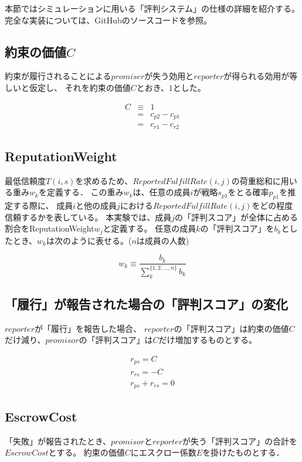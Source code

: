 本節ではシミュレーションに用いる「評判システム」の仕様の詳細を紹介する。
完全な実装については、GitHubのソースコード\cite{mitamoto2021}を参照。

\subsection{約束の価値$C$}
約束が履行されることによる$promiser$が失う効用と$reporter$が得られる効用が等しいと仮定し、
それを約束の価値$C$とおき、$1$とした。

\begin{eqnarray}
  C &\equiv& 1 \\
    &=& c_{p2} - c_{p1} \\
    &=& c_{r1} - c_{r2}
\end{eqnarray}

\subsection{ReputationWeight}
最低信頼度$T(i, s)$を求めるため、$ReportedFulfillRate(i, j)$の荷重総和に用いる重み$w_k$を定義する．
この重み$w_k$は、任意の成員$i$が戦略$s_{p1}$をとる確率$p_{p1}$を推定する際に、
成員$i$と他の成員$j$における$ReportedFulfillRate(i, j)$をどの程度信頼するかを表している。
本実験では、成員$j$の「評判スコア」が全体に占める割合をReputationWeight$w_j$と定義する。
任意の成員$k$の「評判スコア」を$b_k$としたとき、$w_k$は次のように表せる。($n$は成員の人数)

\begin{equation*}
  w_k \equiv \frac{b_k}{\sum^{\{1,2,...,n\}}_{k}b_k}
\end{equation*}

\subsection{「履行」が報告された場合の「評判スコア」の変化}
$reporter$が「履行」を報告した場合、
$reporter$の「評判スコア」は約束の価値$C$だけ減り、$promisor$の「評判スコア」は$C$だけ増加するものとする。

\begin{gather}
  r_{ps} = C \\
  r_{rs} = -C \\
  r_{ps} + r_{rs} = 0
\end{gather}


\subsection{EscrowCost}
「失敗」が報告されたとき、$promisor$と$reporter$が失う「評判スコア」の合計を$EscrowCost$とする。
約束の価値$C$にエスクロー係数$E$を掛けたものとする．

